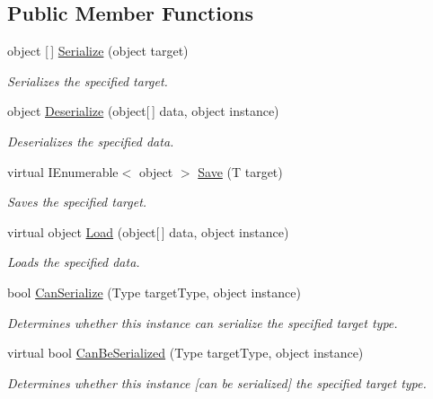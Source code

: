 \subsection*{Public Member Functions}
\begin{DoxyCompactItemize}
\item 
object \mbox{[}$\,$\mbox{]} \hyperlink{class_serializer_extension_base_affe527ff9e902bb2eeaa37ec1a9d2f19}{Serialize} (object target)
\begin{DoxyCompactList}\small\item\em Serializes the specified target. \end{DoxyCompactList}\item 
object \hyperlink{class_serializer_extension_base_a04524500adb2abafdb0e606148145e07}{Deserialize} (object\mbox{[}$\,$\mbox{]} data, object instance)
\begin{DoxyCompactList}\small\item\em Deserializes the specified data. \end{DoxyCompactList}\item 
virtual I\+Enumerable$<$ object $>$ \hyperlink{class_serializer_extension_base_a258793f178a3f8ef78dfd7ca139d4411}{Save} (T target)
\begin{DoxyCompactList}\small\item\em Saves the specified target. \end{DoxyCompactList}\item 
virtual object \hyperlink{class_serializer_extension_base_a3792a9b27056e30ca0ac91531936ae47}{Load} (object\mbox{[}$\,$\mbox{]} data, object instance)
\begin{DoxyCompactList}\small\item\em Loads the specified data. \end{DoxyCompactList}\item 
bool \hyperlink{class_serializer_extension_base_af730b106e15a036d8099ebf63d6df543}{Can\+Serialize} (Type target\+Type, object instance)
\begin{DoxyCompactList}\small\item\em Determines whether this instance can serialize the specified target type. \end{DoxyCompactList}\item 
virtual bool \hyperlink{class_serializer_extension_base_a50e69037fda6bdcc080cdc3c51d25b99}{Can\+Be\+Serialized} (Type target\+Type, object instance)
\begin{DoxyCompactList}\small\item\em Determines whether this instance \mbox{[}can be serialized\mbox{]} the specified target type. \end{DoxyCompactList}\end{DoxyCompactItemize}


